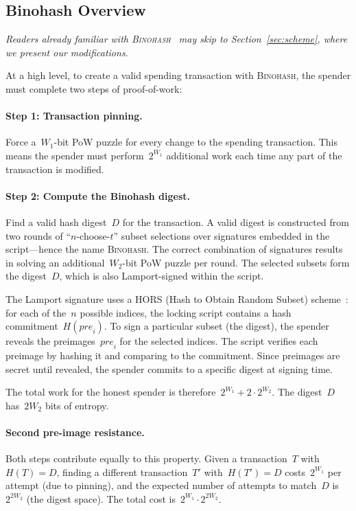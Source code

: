 \documentclass[11pt, a4paper]{article}
\begin{document}
\subsection{Binohash Overview}
\label{sec:binohash-overview}

\noindent\textit{Readers already familiar with \textsc{Binohash}~\cite{linus2024binohash} may skip to Section~\ref{sec:scheme}, where we present our modifications.}

\medskip

At a high level, to create a valid spending transaction with \textsc{Binohash}, the spender must complete two steps of proof-of-work:

\paragraph{Step 1: Transaction pinning.}
Force a~$W_1$-bit PoW puzzle for every change to the spending transaction. This means the spender must perform~$2^{W_1}$ additional work each time any part of the transaction is modified.

\paragraph{Step 2: Compute the Binohash digest.}
Find a valid hash digest~$D$ for the transaction. A valid digest is constructed from two rounds of ``$n$-choose-$t$'' subset selections over signatures embedded in the script---hence the name \textsc{Binohash}. The correct combination of signatures results in solving an additional~$W_2$-bit PoW puzzle per round. The selected subsets form the digest~$D$, which is also Lamport-signed within the script.

The Lamport signature uses a HORS (Hash to Obtain Random Subset) scheme~\cite{reyzin2002}: for each of the~$n$ possible indices, the locking script contains a hash commitment~$H(\mathit{pre}_i)$. To sign a particular subset (the digest), the spender reveals the preimages~$\mathit{pre}_i$ for the selected indices. The script verifies each preimage by hashing it and comparing to the commitment. Since preimages are secret until revealed, the spender commits to a specific digest at signing time.

\medskip

The total work for the honest spender is therefore~$2^{W_1} + 2 \cdot 2^{W_2}$. The digest~$D$ has~$2 W_2$ bits of entropy.

\paragraph{Second pre-image resistance.}
Both steps contribute equally to this property. Given a transaction~$T$ with~$H(T) = D$, finding a different transaction~$T'$ with~$H(T') = D$ costs~$2^{W_1}$ per attempt (due to pinning), and the expected number of attempts to match~$D$ is~$2^{2 W_2}$ (the digest space). The total cost is~$2^{W_1} \cdot 2^{2 W_2}$.
\end{document}
